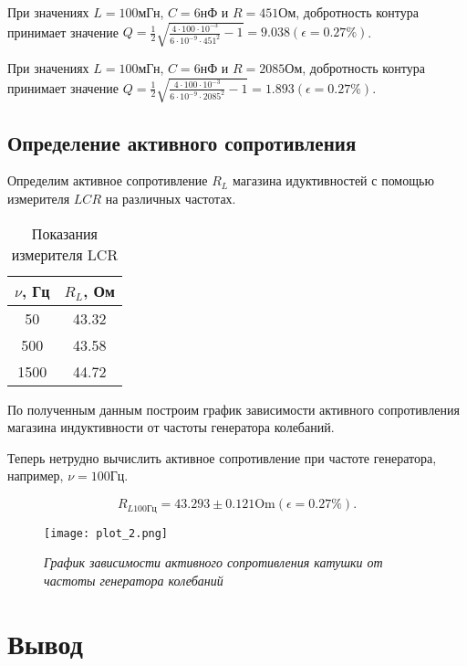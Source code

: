 \documentclass[a4paper,12pt]{article} %
\begin{document}
    При значениях $L = 100 \text{мГн}$, $C = 6 \text{нФ}$ и $R = 451 \text{Ом}$, добротность контура принимает значение $Q = \frac{1}{2}\sqrt{\frac{4\cdot 100 \cdot 10^{-3}}{6 \cdot 10^{-9} \cdot 451^{2}} - 1} = 9.038 (\epsilon = 0.27\%)$.

    При значениях $L = 100 \text{мГн}$, $C = 6 \text{нФ}$ и $R = 2085 \text{Ом}$, добротность контура принимает значение $Q = \frac{1}{2}\sqrt{\frac{4\cdot 100 \cdot 10^{-3}}{6 \cdot 10^{-9} \cdot 2085^{2}} - 1} = 1.893 (\epsilon = 0.27\%)$.

\subsection{Определение активного сопротивления}

Определим активное сопротивление $R_{L}$ магазина идуктивностей с помощью измерителя $LCR$ на различных частотах.

    \begin{table}[h]
	\centering
	\begin{tabular}{|c|c|}
		\hline
		$\nu$, Гц & $R_{L}$, Ом \\ \hline
            50 & 43.32 \\
		  500 & 43.58 \\
		  1500 & 44.72 \\
		\hline
	\end{tabular}
	\caption{Показания измерителя LCR}
        \label{table3}
    \end{table}

По полученным данным построим график зависимости активного сопротивления магазина индуктивности от частоты генератора колебаний.

Теперь нетрудно вычислить активное сопротивление при частоте генератора, например, $\nu = 100 \text{Гц}$.

\[ R_{L 100\text{Гц}} = 43.293 \pm 0.121 \text{Om} (\epsilon = 0.27\%) . \]

\begin{figure}[h]
\begin{center}
		\texttt{[image: plot\_2.png]}
\end{center}
	\caption{\textit{График зависимости активного сопротивления катушки от частоты генератора колебаний}}
	\label{img1}
\end{figure}

\section{Вывод}
\end{document}
